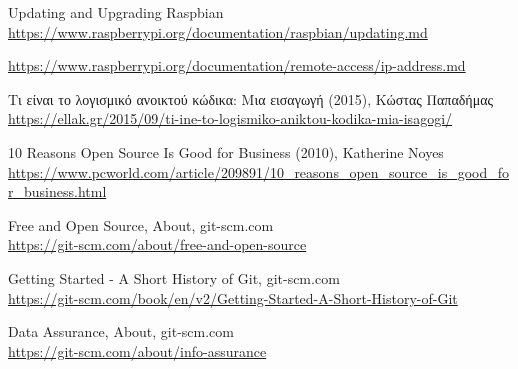 \begin{thebibliography}{99}
Updating and Upgrading Raspbian
\url{https://www.raspberrypi.org/documentation/raspbian/updating.md}

\url{https://www.raspberrypi.org/documentation/remote-access/ip-address.md}

Τι είναι το λογισμικό ανοικτού κώδικα: Μια εισαγωγή (2015), Κώστας Παπαδήμας\\
\url{https://ellak.gr/2015/09/ti-ine-to-logismiko-aniktou-kodika-mia-isagogi/}

10 Reasons Open Source Is Good for Business (2010), Katherine Noyes\\
\url{https://www.pcworld.com/article/209891/10_reasons_open_source_is_good_for_business.html}

Free and Open Source, About, git-scm.com\\
\url{https://git-scm.com/about/free-and-open-source}

Getting Started - A Short History of Git, git-scm.com\\
\url{https://git-scm.com/book/en/v2/Getting-Started-A-Short-History-of-Git}

Data Assurance, About, git-scm.com\\
\url{https://git-scm.com/about/info-assurance}


\end{thebibliography}